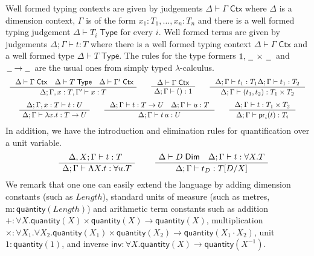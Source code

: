 \documentclass[a4paper,UKenglish]{lipics}
\newcommand{\ra}{\rightarrow}
\newcommand{\msf}[1]{\mathsf{#1}} %
\newcommand{\blank}{\, \underline{\hspace{2mm}} \,}
\newcommand{\num}{\msf{quantity}}
\newcommand{\length}{\mathit{Length}}
\newcommand{\cj}[2]{#1 \vdash #2 \; \msf{ Ctx}}
\newcommand{\Tj}[2]{#1 \vdash #2 \; \msf{ Type}}
\newcommand{\Dj}[2]{#1 \vdash #2 \; \msf{ Dim}}
\newcommand{\tj}[4]{#1;#2 \vdash #3 : #4}
\newcommand{\proj}{\mathsf{pr}}
\newcommand{\pack}[2]{\mathsf{pack}(#1,#2)}
\newcommand{\unpack}[4]{\mathsf{unpack}\,#1\,\mathsf{as}\,(#2,#3)\,\mathsf{in}\,#4}
\newcommand{\Dim}{D}
\newcommand{\Dvar}{X}
\begin{document}
Well formed typing contexts are given by judgements
$\cj\Delta\Gamma $ where $\Delta$ is a dimension context, $\Gamma$ is
of the form ${x_1 : T_1, \ldots, x_n:T_n}$ and there is a well formed
typing judgement $\Tj\Delta{ T_i}$ for every $i$. Well formed terms
are given by judgements $\tj \Delta \Gamma t T$ where there is a
well formed typing context $\cj \Delta \Gamma$ and
a well formed type $\Tj \Delta T $. The rules for
the type formers $\msf{1}, \blank\times\blank$ and $\blank \! \ra \! \blank$ are the usual ones from
simply typed $\lambda$-calculus.
\[\begin{array}{c}
\AxiomC{
$\cj \Delta\Gamma\quad
\Tj\Delta T\quad
\cj\Delta {\Gamma'}$}
\UnaryInfC
{$\tj \Delta{\Gamma,x:T,\Gamma'}xT$}
\DisplayProof
\qquad
\AxiomC{
$\cj\Delta {\Gamma}
$
}
\UnaryInfC
{$\tj \Delta{\Gamma}{()}1$}
\DisplayProof
\qquad
\AxiomC{
$
\tj\Delta {\Gamma} {t_1}{T_1}
\tj\Delta {\Gamma} {t_1}{T_2}
$
}
\UnaryInfC
{$\tj \Delta{\Gamma}{(t_1,t_2)}{T_1\times T_2}$}
\DisplayProof
\\[5mm]
\AxiomC{
$
\tj\Delta {\Gamma,x:T} {t}{U}
$
}
\UnaryInfC
{$\tj\Delta {\Gamma} {\lambda x.t}{T\to U}$}
\DisplayProof
\qquad
\AxiomC{
$
\tj\Delta {\Gamma} {t}{T\to U}\quad
\tj\Delta {\Gamma} {u}{T}
$
}
\UnaryInfC
{$\tj \Delta{\Gamma}{t\,u}U$}
\DisplayProof
\qquad
\AxiomC{
$
\tj\Delta {\Gamma} {t}{T_1\times T_2}
$
}
\UnaryInfC
{$\tj\Delta {\Gamma} {\proj_i(t)}{T_i}$}
\DisplayProof
\end{array}\]
In addition, we have the introduction and elimination rules for quantification over a unit variable.
\[\begin{array}{cc}
\hspace{5mm}
\AxiomC{$\tj{\Delta,\Dvar}\Gamma tT$ }
		\UnaryInfC{$\tj \Delta  \Gamma {\Lambda \Dvar.t} {\forall u.T}$}
		\DisplayProof

&\hspace{5mm}
\AxiomC{$\Dj\Delta \Dim \quad \tj \Delta \Gamma  t{\forall \Dvar.T}$}
	\UnaryInfC{$\tj \Delta  \Gamma {t_\Dim}{T[\Dim/\Dvar]}$}
	\DisplayProof
%
\end{array}\]
We remark that one
one can easily extend the language by adding
dimension constants (such as $\length$),
standard units of measure (such as metres, $\mathrm{m}:\num(\length)$)
and
arithmetic term constants
such as addition
$+:\forall \Dvar. \num(\Dvar)\times  \num(\Dvar) \rightarrow \num(\Dvar)$,
multiplication $\times :\forall \Dvar_1. \forall \Dvar_2. \num(\Dvar_1)\times \num(\Dvar_2) \rightarrow \num(\Dvar_1 \cdot \Dvar_2)$,
unit $1:\num(1)$,
and inverse $\mathsf{inv}:\forall \Dvar.\num(\Dvar)\to \num (\Dvar^{-1})$.
\end{document}
